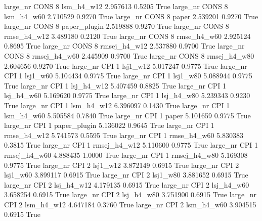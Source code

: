   large_nr     CONS                 8   lsm_h4_w12    2.957613      0.5205    True
  large_nr     CONS                 8   lsm_h4_w60    2.710529      0.9270    True
  large_nr     CONS                 8        paper    2.539201      0.9270    True
  large_nr     CONS                 8 paper_plugin    2.519888      0.9270    True
  large_nr     CONS                 8  rmse_h4_w12    3.489180      0.2120    True
  large_nr     CONS                 8  rmse_h4_w60    2.925124      0.8695    True
  large_nr     CONS                 8 rmsej_h4_w12    2.537880      0.9700    True
  large_nr     CONS                 8 rmsej_h4_w60    2.445909      0.9700    True
  large_nr     CONS                 8 rmsej_h4_w80    2.604656      0.9270    True
  large_nr      CPI                 1     lsj1_w12    5.017247      0.9775    True
  large_nr      CPI                 1     lsj1_w60    5.104434      0.9775    True
  large_nr      CPI                 1     lsj1_w80    5.088944      0.9775    True
  large_nr      CPI                 1   lsj_h4_w12    5.407459      0.8825    True
  large_nr      CPI                 1   lsj_h4_w60    5.169620      0.9775    True
  large_nr      CPI                 1   lsj_h4_w80    5.239343      0.9230    True
  large_nr      CPI                 1   lsm_h4_w12    6.396097      0.1430    True
  large_nr      CPI                 1   lsm_h4_w60    5.505584      0.7840    True
  large_nr      CPI                 1        paper    5.101659      0.9775    True
  large_nr      CPI                 1 paper_plugin    5.136022      0.9645    True
  large_nr      CPI                 1  rmse_h4_w12    5.741573      0.5595    True
  large_nr      CPI                 1  rmse_h4_w60    5.830383      0.3815    True
  large_nr      CPI                 1 rmsej_h4_w12    5.110600      0.9775    True
  large_nr      CPI                 1 rmsej_h4_w60    4.888435      1.0000    True
  large_nr      CPI                 1 rmsej_h4_w80    5.169308      0.9775    True
  large_nr      CPI                 2     lsj1_w12    3.872149      0.6915    True
  large_nr      CPI                 2     lsj1_w60    3.899117      0.6915    True
  large_nr      CPI                 2     lsj1_w80    3.881652      0.6915    True
  large_nr      CPI                 2   lsj_h4_w12    4.179135      0.6915    True
  large_nr      CPI                 2   lsj_h4_w60    3.658254      0.6915    True
  large_nr      CPI                 2   lsj_h4_w80    3.751900      0.6915    True
  large_nr      CPI                 2   lsm_h4_w12    4.647184      0.3760    True
  large_nr      CPI                 2   lsm_h4_w60    3.904515      0.6915    True
